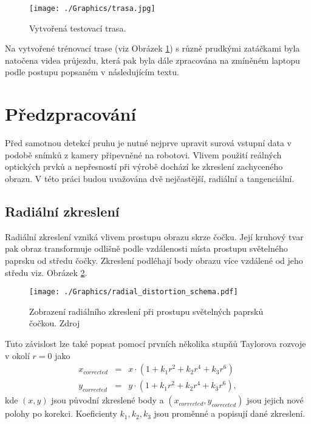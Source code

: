 \documentclass[czech, bc, kky, he, iso690numb]{fasthesis}
\begin{document}
            	\begin{figure}[h]
            		\centering
            		\texttt{[image: ./Graphics/trasa.jpg]}
            		\caption{Vytvořená testovací trasa.}
            		\label{pic:trasa}
            	\end{figure}
            
            Na vytvořené trénovací trase (viz Obrázek \ref{pic:trasa}) s různě prudkými zatáčkami byla natočena videa průjezdu, která pak byla dále zpracována na zmíněném laptopu podle postupu popsaném v následujícím textu.
            	
        \section{Předzpracování}
        	Před samotnou detekcí pruhu je nutné nejprve upravit surová vstupní data v podobě snímků z kamery připevněné na robotovi. Vlivem použití reálných optických prvků a nepřesností při výrobě dochází ke zkreslení zachyceného obrazu. V této práci budou uvažována dvě nejčastější, radiální a tangenciální.
        	
        	\subsection{Radiální zkreslení}
        		Radiální zkreslení vzniká vlivem prostupu obrazu skrze čočku. Její kruhový tvar pak obraz transformuje odlišně podle vzdálenosti místa prostupu světelného paprsku od středu čočky. Zkreslení podléhají body obrazu více vzdálené od jeho středu viz. Obrázek \ref{pic:radial_distortion}.
        		
        			\begin{figure}[h]
        				\centering
        				\texttt{[image: ./Graphics/radial\_distortion\_schema.pdf]}
        				\caption{Zobrazení radiálního zkreslení při prostupu světelných paprsků čočkou. Zdroj \cite[p.~376]{learning_opencv} }
        				\label{pic:radial_distortion}
        			\end{figure}
        			
        		Tuto závislost lze také popsat pomocí prvních několika stupňů Taylorova rozvoje  v okolí \(r=0\) jako
        		\begin{eqnarray}
        			x_{corrected} &=& x\cdot(1 + k_{1}r^{2} + k_{2}r^{4} + k_{3}r^{6})\\
        			y_{corrected} &=& y\cdot(1 + k_{1}r^{2} + k_{2}r^{4} + k_{3}r^{6}),
        		\end{eqnarray}
        		kde \((x,y)\) jsou původní zkreslené body a \((x_{corrected}, y_{corrected})\) jsou jejich nové polohy po korekci. Koeficienty \(k_{1}, k_{2}, k_{3}\) jsou proměnné a popisují dané zkreslení.
\end{document}
